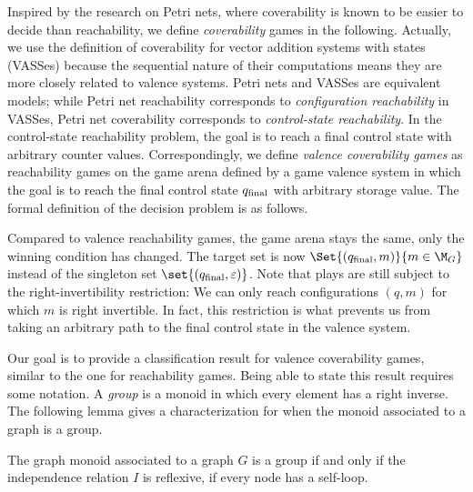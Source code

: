 \documentclass[../../diss.tex]{subfiles}
\begin{document}
Inspired by the research on Petri nets, where coverability is known to be easier to decide than reachability, we define \emph{coverability} games in the following.
Actually, we use the definition of coverability for vector addition systems with states (VASSes) because the sequential nature of their computations means they are more closely related to valence systems.
Petri nets and VASSes are equivalent models; while Petri net reachability corresponds to \emph{configuration reachability} in VASSes, Petri net coverability corresponds to \emph{control-state reachability}.
In the control-state reachability problem, the goal is to reach a final control state with arbitrary counter values.
Correspondingly, we define \emph{valence coverability games} as reachability games on the game arena defined by a game valence system in which the goal is to reach the final control state $q_{\text{final}}$ with arbitrary storage value.
The formal definition of the decision problem is as follows.

\begin{problem}
\end{problem}

Compared to valence reachability games, the game arena stays the same, only the winning condition has changed.
The target set is now $\Set{ (\qfinal,m) }{ m \in \graphmonoid}$ instead of the singleton set $\set{ (\qfinal,\eps)}$.
Note that plays are still subject to the right-invertibility restriction:
We can only reach configurations $(q,m)$ for which $m$ is right invertible.
In fact, this restriction is what prevents us from taking an arbitrary path to the final control state in the valence system.

Our goal is to provide a classification result for valence coverability games, similar to the one for reachability games.
Being able to state this result requires some notation.
A \emph{group} is a monoid in which every element has a right inverse.
The following lemma gives a characterization for when the monoid associated to a graph is a group.

\begin{lemma}%
\label{Lemma:ValenceCoverabilityGamesGroupGraph}%
    The graph monoid associated to a graph $G$ is a group if and only if the independence relation $I$ is reflexive, \ie if every node has a self-loop.
\end{lemma}
\end{document}
